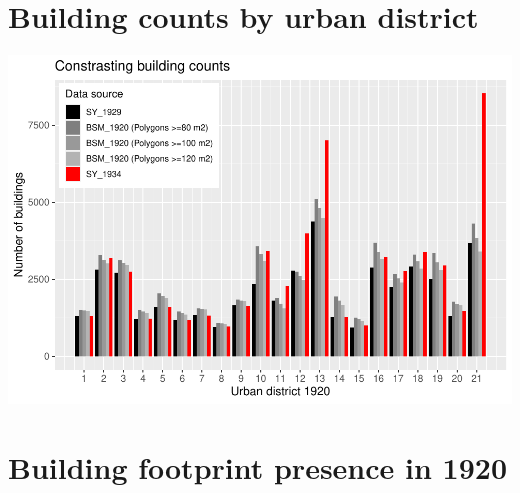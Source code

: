 \documentclass[
]{article}
\begin{document}
\hypertarget{building-counts-by-urban-district}{%
\section{Building counts by urban
district}\label{building-counts-by-urban-district}}

\includegraphics{Usage_code_files/figure-latex/unnamed-chunk-12-1.pdf}

\hypertarget{building-footprint-presence-in-1920}{%
\section{Building footprint presence in
1920}\label{building-footprint-presence-in-1920}}
\end{document}
